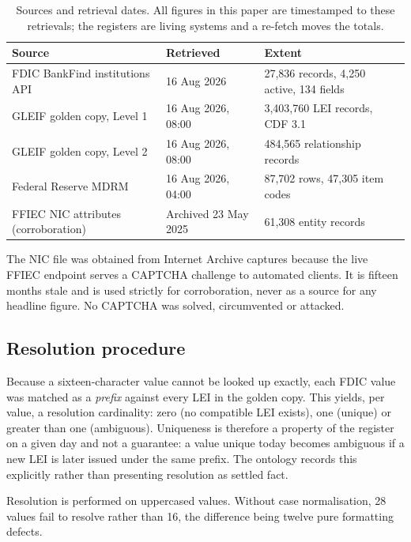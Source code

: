 \documentclass[11pt]{article}
\begin{document}
\begin{table}[h]
\centering
\small
\begin{tabularx}{\textwidth}{@{}llX@{}}
\toprule
Source & Retrieved & Extent \\
\midrule
FDIC BankFind institutions API~\cite{bankfind} & 16 Aug 2026 & 27,836 records, 4,250 active, 134 fields \\
GLEIF golden copy, Level 1~\cite{gleifgc} & 16 Aug 2026, 08:00 & 3,403,760 LEI records, CDF 3.1 \\
GLEIF golden copy, Level 2~\cite{gleifgc} & 16 Aug 2026, 08:00 & 484,565 relationship records \\
Federal Reserve MDRM~\cite{mdrm} & 16 Aug 2026, 04:00 & 87,702 rows, 47,305 item codes \\
FFIEC NIC attributes (corroboration) & Archived 23 May 2025 & 61,308 entity records \\
\bottomrule
\end{tabularx}
\caption{Sources and retrieval dates. All figures in this paper are timestamped to these retrievals; the registers are living systems and a re-fetch moves the totals.}
\label{tab:sources}
\end{table}

\noindent The NIC file was obtained from Internet Archive captures because the live FFIEC endpoint serves a CAPTCHA challenge to automated clients. It is fifteen months stale and is used strictly for corroboration, never as a source for any headline figure. No CAPTCHA was solved, circumvented or attacked.

\subsection{Resolution procedure}
Because a sixteen-character value cannot be looked up exactly, each FDIC value was matched as a \emph{prefix} against every LEI in the golden copy. This yields, per value, a resolution cardinality: zero (no compatible LEI exists), one (unique) or greater than one (ambiguous). Uniqueness is therefore a property of the register on a given day and not a guarantee: a value unique today becomes ambiguous if a new LEI is later issued under the same prefix. The ontology records this explicitly rather than presenting resolution as settled fact.

Resolution is performed on uppercased values. Without case normalisation, 28 values fail to resolve rather than 16, the difference being twelve pure formatting defects.
\end{document}
